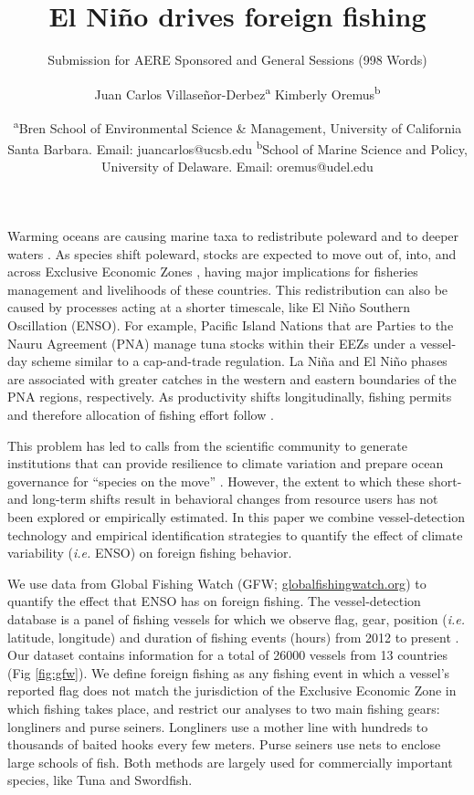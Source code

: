 \documentclass[]{article}
\title{El Niño drives foreign fishing}
\subtitle{Submission for AERE Sponsored and General Sessions (998 Words)}
\author{Juan Carlos Villaseñor-Derbez\textsuperscript{a} Kimberly
Oremus\textsuperscript{b}}
\date{\textsuperscript{a}Bren School of Environmental Science \& Management,
University of California Santa Barbara. Email: juancarlos@ucsb.edu \textsuperscript{b}School of
Marine Science and Policy, University of Delaware. Email: oremus@udel.edu}
\begin{document}
\maketitle

Warming oceans are causing marine taxa to redistribute poleward and to deeper waters \citep{pinsky_2013}. As species shift poleward, stocks are expected to move out of, into, and across Exclusive Economic Zones \citep{poloczanska_2013}, having major implications for fisheries management and livelihoods of these countries. This redistribution can also be caused by processes acting at a shorter timescale, like El Niño Southern Oscillation (ENSO). For example, Pacific Island Nations that are Parties to the Nauru Agreement (PNA) manage tuna stocks within their EEZs under a vessel-day scheme similar to a cap-and-trade regulation. La Niña and El Niño phases are associated with greater catches in the western and eastern boundaries of the PNA regions, respectively. As productivity shifts longitudinally, fishing permits and therefore allocation of fishing effort follow \citep{aqorau_2018}.

This problem has led to calls from the scientific community to generate institutions that can provide resilience to climate variation and prepare ocean governance for ``species on the move'' \citep{pinsky_2018}. However, the extent to which these short- and long-term shifts result in behavioral changes from resource users has not been explored or empirically estimated. In this paper we combine vessel-detection technology and empirical identification strategies to quantify the effect of climate variability (\emph{i.e.} ENSO) on foreign fishing behavior.

We use data from Global Fishing Watch (GFW; \href{www.globalfishingwatch.org}{globalfishingwatch.org}) to quantify the effect that ENSO has on foreign fishing. The vessel-detection database is a panel of fishing vessels for which we observe flag, gear, position (\emph{i.e.} latitude, longitude) and duration of fishing events (hours) from 2012 to present \citep{kroodsma_2018}. Our dataset contains information for a total of 26000 vessels from 13 countries (Fig \ref{fig:gfw}). We define foreign fishing as any fishing event in which a vessel's reported flag does not match the jurisdiction of the Exclusive Economic Zone in which fishing takes place, and restrict our analyses to two main fishing gears: longliners and purse seiners. Longliners use a mother line with hundreds to thousands of baited hooks every few meters. Purse seiners use nets to enclose large schools of fish. Both methods are largely used for commercially important species, like Tuna and Swordfish.
\end{document}
